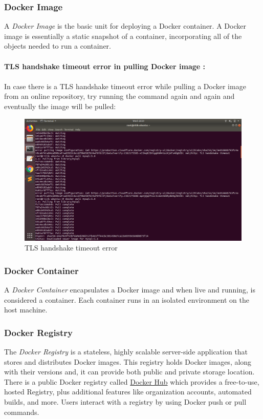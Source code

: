 \documentclass[12pt]{article}
\begin{document}
\subsubsection{Docker Image}
A \textit{Docker Image} is the basic unit for deploying a Docker container. A Docker image is essentially a static snapshot of a container, incorporating all of the objects needed to run a container.\\\\
\textbf{TLS handshake timeout error in pulling Docker image :}\\\\
In case there is a TLS handshake timeout error while pulling a Docker image from an online repository, try running the command again and again and eventually the image will be pulled:
\begin{figure}[h!]
	\begin{center}
		\includegraphics[totalheight=0.4\textheight]{TLS}
		\caption{TLS handshake timeout error}
	\end{center}
\end{figure} 
\subsubsection{Docker Container}
A \textit{Docker Container} encapsulates a Docker image and when live and running, is considered a container. Each container runs in an isolated environment on the host machine.
\subsubsection{Docker Registry}
The \textit{Docker Registry} is a stateless, highly scalable server-side application that stores and distributes Docker images. This registry holds Docker images, along with their versions and, it can provide both public and private storage location. There is a public Docker registry called \href{https://hub.docker.com/}{Docker Hub} which provides a free-to-use, hosted Registry, plus additional features like organization accounts, automated builds, and more. Users interact with a registry by using Docker push or pull commands.
\end{document}
